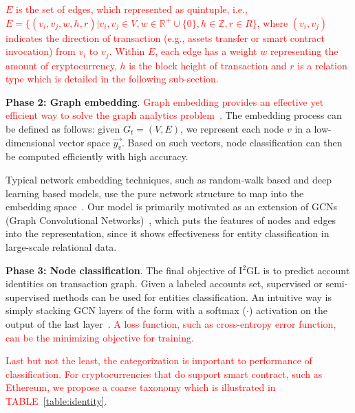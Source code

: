 \textcolor{red}{$E$ is the set of edges, which represented as quintuple, i.e., $E=\{(v_i,v_j,w,h,r)|v_i,v_j \in V, w\in \mathbb{R}^+ \cup\{0\}, h\in \mathbb{Z}, r\in R\}$, where $(v_{i},v_{j})$ indicates the direction of transaction (e.g., assets transfer or smart contract invocation) from $v_i$ to $v_j$. Within $E$, each edge has a weight $w$ representing the amount of cryptocurrency, $h$ is the block height of transaction and $r$ is a relation type which is detailed in the following sub-section.}


\textbf{Phase 2: Graph embedding}.
\textcolor{red}{Graph embedding provides an effective yet efficient way to solve the graph analytics problem~\cite{cai2018comprehensive}.} The embedding process can be defined as follows: given $G_{t}=(V,E)$, we represent each node $v$ in a low-dimensional vector space $\vec{y_v}$. Based on such vectors, node classification can then be computed efficiently with high accuracy.

Typical network embedding techniques, such as random-walk based and deep learning based models, use the pure network structure to map into the embedding space~\cite{goyal2018capturing}. Our model is primarily motivated as an extension of GCNs (Graph Convolutional Networks)~\cite{kipf2016semi,schlichtkrull2018modeling}, which puts the features of nodes and edges into the representation, since it shows effectiveness for entity classification in large-scale relational data.


\textbf{Phase 3: Node classification}.
The final objective of I$^2$GL is to predict account identities on transaction graph. Given a labeled accounts set, supervised or semi-supervised methods can be used for entities classification. An intuitive way is simply stacking GCN layers of the form with a softmax ($\cdot$) activation on the output of the last layer~\cite{schlichtkrull2018modeling}. \textcolor{red}{A loss function, such as cross-entropy error function, can be the minimizing objective for training.}

\textcolor{red}{Last but not the least, the categorization is important to performance of classification. For cryptocurrencies that do support smart contract, such as Ethereum, we propose a coarse taxonomy which is illustrated in TABLE~\ref{table:identity}.} 


